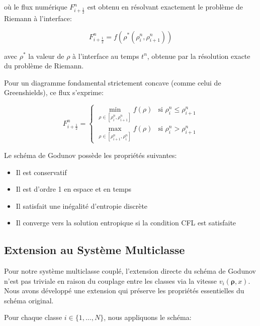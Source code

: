 où le flux numérique $F_{i+\frac{1}{2}}^n$ est obtenu en résolvant exactement le problème de Riemann à l'interface:

\begin{equation}
F_{i+\frac{1}{2}}^n = f\left(\rho^*\left(\rho_i^n, \rho_{i+1}^n\right)\right)
\end{equation}

avec $\rho^*$ la valeur de $\rho$ à l'interface au temps $t^n$, obtenue par la résolution exacte du problème de Riemann.

Pour un diagramme fondamental strictement concave (comme celui de Greenshields), ce flux s'exprime:

\begin{equation}
F_{i+\frac{1}{2}}^n = 
\begin{cases} 
\min_{\rho \in [\rho_i^n, \rho_{i+1}^n]} f(\rho) & \text{si } \rho_i^n \leq \rho_{i+1}^n \\
\max_{\rho \in [\rho_{i+1}^n, \rho_i^n]} f(\rho) & \text{si } \rho_i^n > \rho_{i+1}^n
\end{cases}
\end{equation}

\begin{theorem}
Le schéma de Godunov possède les propriétés suivantes:
\begin{itemize}
    \item Il est conservatif
    \item Il est d'ordre 1 en espace et en temps
    \item Il satisfait une inégalité d'entropie discrète
    \item Il converge vers la solution entropique si la condition CFL est satisfaite
\end{itemize}
\end{theorem}

\subsection{Extension au Système Multiclasse}
\label{subsec:extension_multiclasse}

Pour notre système multiclasse couplé, l'extension directe du schéma de Godunov n'est pas triviale en raison du couplage entre les classes via la vitesse $v_i(\boldsymbol{\rho}, x)$. Nous avons développé une extension qui préserve les propriétés essentielles du schéma original.

Pour chaque classe $i \in \{1,\ldots,N\}$, nous appliquons le schéma:

